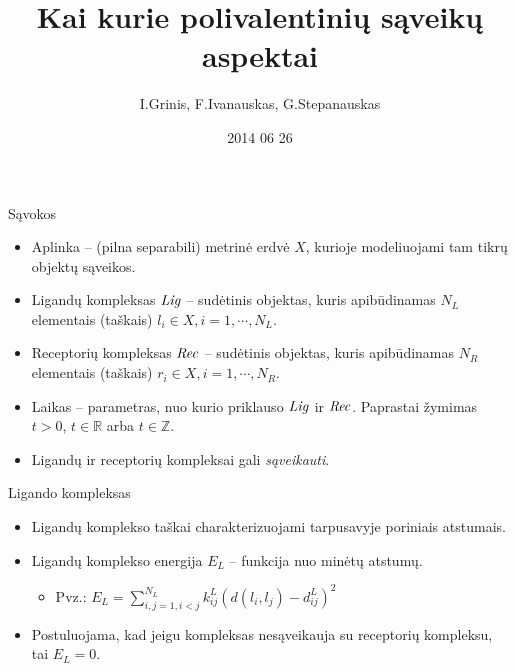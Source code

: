 \documentclass[11pt]{beamer}
\author{I.Grinis, F.Ivanauskas, G.Stepanauskas}
\title{Kai kurie polivalentinių sąveikų aspektai}
\institute{VU MIF}
\date{2014 06 26}
\begin{document}
\begin{frame}
\titlepage
\end{frame}

\begin{frame}
\tableofcontents
\end{frame}


\begin{frame}{Sąvokos}
\begin{itemize}
\item Aplinka -- (pilna separabili)  metrinė erdvė $X$, kurioje  modeliuojami tam tikrų objektų sąveikos.
\item Ligandų kompleksas $\mbox{\textit{Lig}}$ -- sudėtinis objektas, kuris apibūdinamas $N_L$ elementais (taškais)   $l_i \in X, i=1,\cdots, N_L$.
\item Receptorių  kompleksas $\mbox{\textit{Rec}}$ -- sudėtinis objektas, kuris apibūdinamas $N_R$ elementais (taškais) $ r_i \in X, i=1, \cdots, N_R$. 
\item Laikas -- parametras, nuo kurio priklauso $\mbox{\textit{Lig}}$ ir $\mbox{\textit{Rec}}$. Paprastai žymimas $t>0$, $t \in \mathbb{R}$ arba  $t \in \mathbb{Z}$.
\item Ligandų ir receptorių kompleksai gali \textit{sąveikauti}.
\end{itemize}
\end{frame}


\begin{frame}{Ligando kompleksas}
\begin{itemize}
\item Ligandų komplekso taškai charakterizuojami tarpusavyje poriniais atstumais.
\item Ligandų komplekso energija $E_L$  -- funkcija nuo minėtų atstumų.
    \begin{itemize}
       \item Pvz.: $E_L = \sum\limits_{i,j=1,i<j}^{N_L} k_{ij}^L (d(l_i,l_j) - d_{ij}^L)^{2} $
    \end{itemize}
\item Postuluojama, kad jeigu kompleksas nesąveikauja su receptorių kompleksu, tai $E_L = 0$.
\end{itemize}
\end{frame}
\end{document}
